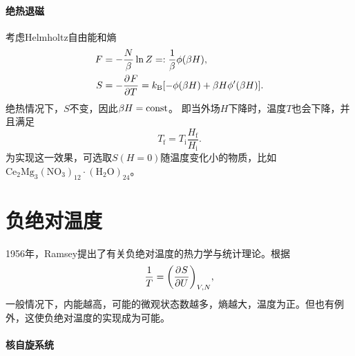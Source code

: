 \paragraph{绝热退磁}

考虑Helmholtz自由能和熵
\begin{align*}
	F&=-\frac N\beta\ln Z=:\frac1\beta\phi(\beta H),\\
	S&=-\pv FT=\kB[-\phi(\beta H)+\beta H\phi'(\beta H)].
\end{align*}
绝热情况下，$S$不变，因此$\beta H=\const$。
即当外场$H$下降时，温度$T$也会下降，并且满足
\[
	T_\mathrm f=T_\mathrm i\frac{H_\mathrm f}{H_\mathrm i}.
\]
为实现这一效果，可选取$S(H=0)$随温度变化小的物质，比如$\mathrm{Ce_2Mg_3(NO_3)_{12}\cdot(H_2O)_{24}}$。

\section{负绝对温度}

1956年，Ramsey提出了有关负绝对温度的热力学与统计理论。根据
\[
	\frac1T=\pu[V,N]SU,
\]
一般情况下，内能越高，可能的微观状态数越多，熵越大，温度为正。但也有例外，这使负绝对温度的实现成为可能。

\paragraph{核自旋系统}

